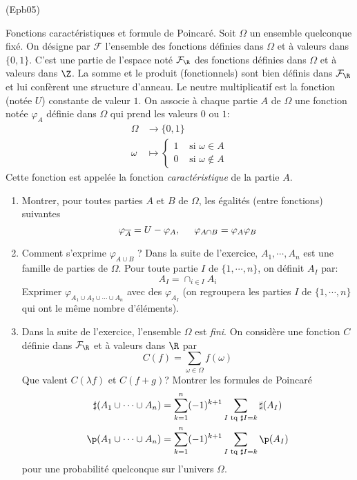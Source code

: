 \begin{tiny}(Epb05)\end{tiny} \label{fPoinc} Fonctions caractéristiques et formule de Poincaré.\newline
Soit $\Omega$ un ensemble quelconque fixé. On désigne par $\mathcal{F}$ l'ensemble des fonctions définies dans $\Omega$ et à valeurs dans $\{0,1\}$. C'est une partie de l'espace noté $\mathcal{F}_\R$ des fonctions définies dans $\Omega$ et à valeurs dans $\Z$. La somme et le produit (fonctionnels) sont bien définis dans $\mathcal{F}_\R$ et lui confèrent une structure d'anneau. Le neutre multiplicatif est la fonction (notée $U$) constante de valeur $1$.\newline
On associe à chaque partie $A$ de $\Omega$ une fonction notée $\varphi_A$ définie dans $\Omega$ qui prend les valeurs $0$ ou $1$:
\begin{align*}
\Omega &\rightarrow \{0,1\}\\
\omega &\mapsto
\left\lbrace 
\begin{aligned}
 1 &\text{ si } \omega\in A\\
 0 &\text{ si } \omega \notin A 
\end{aligned}
\right. 
\end{align*}
Cette fonction est appelée la fonction \emph{caractéristique} de la partie $A$.  
\begin{enumerate}
 \item Montrer, pour toutes parties $A$ et $B$ de $\Omega$, les égalités (entre fonctions) suivantes
\begin{displaymath}
 \varphi_{\overline{A}} = U - \varphi_A,\hspace{0.5cm}
\varphi_{A\cap B} = \varphi_A \varphi_B
\end{displaymath}
 \item  Comment s'exprime $\varphi_{A\cup B}$ ?\newline
Dans la suite de l'exercice, $A_1, \cdots, A_n$ est une famille de parties de $\Omega$. Pour toute partie $I$ de $\{1,\cdots,n\}$, on définit $A_I$ par:
\begin{displaymath}
 A_I = \cap_{i\in I}A_i
\end{displaymath}
Exprimer $\varphi_{A_1\cup A_2\cup \cdots \cup A_n}$ avec des $\varphi_{A_I}$ (on regroupera les parties $I$ de $\{1,\cdots,n\}$ qui ont le même nombre d'éléments).
\item Dans la suite de l'exercice, l'ensemble $\Omega$ est \emph{fini}. On considère une fonction $C$ définie dans $\mathcal{F}_\R$ et à valeurs dans $\R$ par 
\begin{displaymath}
 C(f) = \sum_{\omega \in \Omega} f(\omega)
\end{displaymath}
Que valent $C(\lambda f)$ et $C(f+g)$?\newline
Montrer les formules de Poincaré
\begin{align*}
 \sharp(A_1\cup \cdots \cup A_n) &=
\sum_{k=1}^{n}(-1)^{k+1}\sum_{I\text{ tq }\sharp I = k}\sharp(A_I) \\
 \p(A_1\cup \cdots \cup A_n) &=
\sum_{k=1}^{n}(-1)^{k+1}\sum_{I\text{ tq }\sharp I = k} \p(A_I)
\end{align*}
pour une probabilité quelconque sur l'univers $\Omega$.
\end{enumerate}

